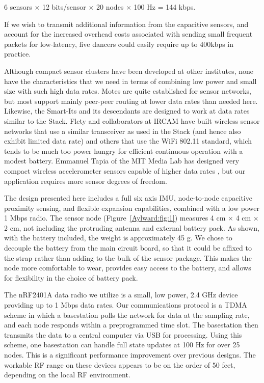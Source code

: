 \begin{center}
6 sensors $\times{}$ 12 bits/sensor $\times{}$ 20 nodes $\times{}$ 100 Hz = 144 kbps.
\end{center}

If we wish to transmit additional information from the capacitive sensors, and account for the increased overhead costs associated with sending small frequent packets for low-latency, five dancers could easily require up to 400kbps in practice.

Although compact sensor clusters have been developed at other institutes, none have the characteristics that we need in terms of combining low power and small size with such high data rates. Motes are quite established for sensor networks, but most support mainly peer-peer routing at lower data rates than needed here. Likewise, the Smart-Its and its descendants \cite{Holmquist:2004} are designed to work at data rates similar to the Stack. Flety and collaborators at IRCAM \cite{Flety:2005} have built wireless sensor networks that use a similar transceiver as used in the Stack (and hence also exhibit limited data rate) and others that use the WiFi 802.11 standard, which tends to be much too power hungry for efficient continuous operation with a modest battery. Emmanuel Tapia of the MIT Media Lab has designed very compact wireless accelerometer sensors capable of higher data rates \cite{Tapia:2004}, but our application requires more sensor degrees of freedom.

The design presented here includes a full six axis IMU, node-to-node capacitive proximity sensing, and flexible expansion capabilities, combined with a low power 1 Mbps radio. The sensor node (Figure~\ref{Aylward:fig:1}) measures 4 cm $\times{}$ 4 cm $\times{}$ 2 cm, not including the protruding antenna and external battery pack. As shown, with the battery included, the weight is approximately 45 g. We chose to decouple the battery from the main circuit board, so that it could be affixed to the strap rather than adding to the bulk of the sensor package. This makes the node more comfortable to wear, provides easy access to the battery, and allows for flexibility in the choice of battery pack.

The nRF2401A data radio we utilize is a small, low power, 2.4 GHz device providing up to 1 Mbps data rates. Our communications protocol is a TDMA scheme \cite{Lovell:2005} in which a basestation polls the network for data at the sampling rate, and each node responds within a preprogrammed time slot. The basestation then transmits the data to a central computer via USB for processing. Using this scheme, one basestation can handle full state updates at 100 Hz for over 25 nodes. This is a significant performance improvement over previous designs. The workable RF range on these devices appears to be on the order of 50 feet, depending on the local RF environment.

